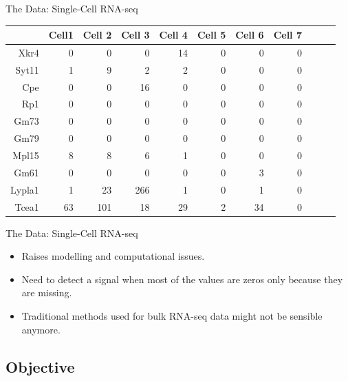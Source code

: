 \documentclass{beamer}
\begin{document}

\begin{frame}{The Data: Single-Cell RNA-seq}

\begin{table}[ht]
\centering
\begin{tabular}{rrrrrrrrrrr}
  \hline
 & Cell1 & Cell 2 & Cell 3 & Cell 4 & Cell 5 & Cell 6 & Cell 7  \\
  \hline
  Xkr4 & 0 & 0 & 0 & 14 & 0 & 0 & 0  \\
  Syt11 & 1 & 9 & 2 & 2 & 0 & 0 & 0  \\
  Cpe & 0 & 0 & 16 & 0 & 0 & 0 & 0  \\
  Rp1 & 0 & 0 & 0 & 0 & 0 & 0 & 0  \\
  Gm73 & 0 & 0 & 0 & 0 & 0 & 0 & 0  \\
  Gm79 & 0 & 0 & 0 & 0 & 0 & 0 & 0  \\
  Mpl15 & 8 & 8 & 6 & 1 & 0 & 0 & 0  \\
  Gm61 & 0 & 0 & 0 & 0 & 0 & 3 & 0 \\
  Lypla1 & 1 & 23 & 266 & 1 & 0 & 1 & 0 \\
  Tcea1 & 63 & 101 & 18 & 29 & 2 & 34 & 0 \\
   \hline
\end{tabular}
\end{table}

\end{frame}

\begin{frame}{The Data: Single-Cell RNA-seq}

\begin{itemize}
  \itemsep10pt
  \item Raises modelling and computational issues.
  \item Need to detect a signal when most of the values are zeros only because
    they are missing.
  \item Traditional methods used for bulk RNA-seq data might not be sensible
    anymore.
\end{itemize}

\end{frame}

\subsection{Objective}
\end{document}

